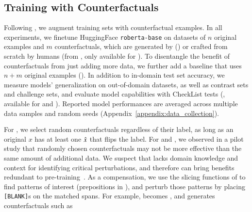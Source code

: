 \subsection{Training with Counterfactuals}

\label{subsec:augmentation}
Following \citet{kaushik2019learning}, we augment training sets with counterfactual examples.
In all experiments, we finetune HuggingFace \texttt{roberta-base} on datasets of $n$ original examples and $m$ counterfactuals, which are generated by \sysname (\maug) or crafted from scratch by humans (\mcad from \citet{kaushik2019learning}, only available for \nli). To disentangle the benefit of counterfactuals from just adding more data, we further add a baseline that uses $n+m$ original examples (\mcomp).
In addition to in-domain test set accuracy, we measure models' generalization on out-of-domain datasets, as well as contrast sets and challenge sets, and evaluate model capabilities with CheckList tests (\cite{checklist:acl20}, available for \sst and \qqp).
Reported model performances are averaged across multiple data samples and random seeds (Appendix~\ref{appendix:data_collection}).


For \sst, we select random \sysname counterfactuals regardless of their label, as long as an original $x$ has at least one $\hat{x}$ that flips the label.
For \nli and \qqp, we observed in a pilot study that randomly chosen counterfactuals may not be more effective than the same amount of additional data.
We suspect that \sysname lacks domain knowledge and context for identifying critical perturbations, and therefore can bring benefits redundant to pre-training~\cite{longpre2020effective}.
As a compensation, we use the slicing functions of \citet{chen2019slice} to find patterns of interest (\eg prepositions in \nli), and perturb those patterns by placing \texttt{[BLANK]}s on the matched spans. For example,  becomes , and \sysname generates counterfactuals such as 




